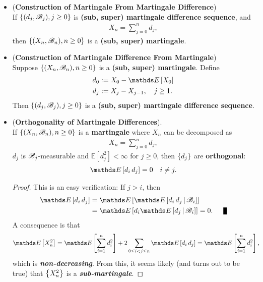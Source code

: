 \documentclass[11pt]{article}
\begin{document}
\begin{itemize}
\item \begin{proposition} (\textbf{Construction of Martingale From Martingale Difference})\citep{resnick2013probability}\\
If $\left\{(d_j, {\mathscr B}_j), j \ge 0\right\}$ is \textbf{(sub, super) martingale difference sequence}, and
\begin{align*}
X_n = \sum_{j=0}^{n} d_j, 
\end{align*} then $\left\{(X_n, {\mathscr B}_n), n \ge 0\right\}$ is a \textbf{(sub, super) martingale}.
\end{proposition}

\item \begin{proposition} (\textbf{Construction of Martingale Difference From Martingale}) \citep{resnick2013probability}\\
Suppose $\left\{(X_n, {\mathscr B}_n), n \ge 0\right\}$ is a \textbf{(sub, super) martingale}. Define
\begin{align*}
d_0&:= X_0 - \E{}{X_0}\\
d_j &:= X_j - X_{j-1}, \quad j\ge 1.
\end{align*}
Then $\left\{(d_j, {\mathscr B}_j), j \ge 0\right\}$ is a \textbf{(sub, super) martingale difference sequence}.
\end{proposition}

\item \begin{proposition} (\textbf{Orthogonality of Martingale Differences}). \citep{resnick2013probability}\\
If $\left\{(X_n, {\mathscr B}_n), n \ge 0\right\}$ is a \textbf{martingale} where $X_n$ can be decomposed as
\begin{align*}
X_n = \sum_{j=0}^{n} d_j, 
\end{align*}  $d_j$ is ${\mathscr B}_j$-measurable and  $\mathds{E}[d_j^2] < \infty$ for $j \ge 0$, then $\left\{d_j\right\}$ are \textbf{orthogonal}:
\begin{align*}
\E{}{d_i\,d_j} = 0 \quad i \neq j.
\end{align*}
\end{proposition}
\begin{proof}
This is an easy verification: If $j > i$, then
\begin{align*}
\E{}{d_i\, d_j} &= \E{}{\E{}{d_i\, d_j \,|\, \srB_i}}\\
&= \E{}{d_i \E{}{d_j \,|\, \srB_i}} = 0. \qed
\end{align*}
A consequence is that
\begin{align*}
\E{}{X_n^2} &= \E{}{\sum_{i=1}^{n}d_i^2} + 2\sum_{0 \le i < j \le n}\E{}{d_i\,d_j} = \E{}{\sum_{i=1}^{n}d_i^2},
\end{align*}
which is \textbf{\emph{non-decreasing}}. From this, it seems likely (and turns out to be true) that $\left\{X_n^2\right\}$ is a \emph{\textbf{sub-martingale}}. 
\end{proof}


\end{itemize}
\end{document}
